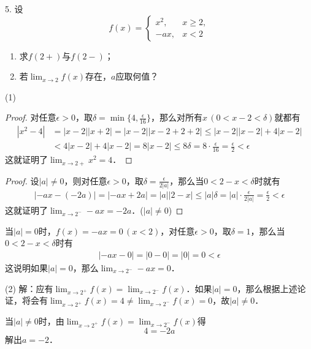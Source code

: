 5. 设
\begin{equation}
    f(x) = \begin{cases}
        x^2, & x \geq 2, \\
        -ax, & x < 2
    \end{cases}
\end{equation}
\begin{enumerate}
    \item 求$f(2+)$与$f(2-)$；
    \item 若$\displaystyle\lim_{x \to 2} f(x)$存在，$a$应取何值？
\end{enumerate}

(1)
\begin{proof}
    对任意$\epsilon > 0$，取$\delta = \min \{ 4, \displaystyle\frac{\epsilon}{16} \}$，那么对所有$x \, (0 < x - 2 < \delta)$就都有
    \begin{align}
        |x^2 - 4| &= |x-2||x+2| = |x-2||x-2 + 2 +2| \leq |x-2||x-2| + 4|x-2| \\
        &< 4|x-2| + 4|x-2| = 8|x-2| \leq 8 \delta = 8 \cdot \frac{\epsilon}{16} = \frac{\epsilon}{2} < \epsilon
    \end{align}
这就证明了$\displaystyle\lim_{x \to 2+} x^2 = 4$．
\end{proof}

\begin{proof}
设$|a| \neq 0$，则对任意$\epsilon > 0$，取$\delta = \displaystyle\frac{\epsilon}{2|a|}$，那么当$0 < 2 - x < \delta$时就有
\begin{align}
|-ax - (-2a)| = |-ax + 2a| = |a||2-x| \leq |a|\delta = |a| \cdot \frac{\epsilon}{2 |a|} = \frac{\epsilon}{2} < \epsilon
\end{align}
这就证明了$\displaystyle\lim_{x \to 2^-} -ax = -2a$．($|a| \neq 0$)
\end{proof}

当$|a|=0$时，$f(x) = -ax = 0 \, (x < 2)$，对任意$\epsilon > 0$，取$\delta = 1$，那么当$0 < 2 - x < \delta$时有
\begin{align}
    |-ax - 0| = |0 - 0| = |0| = 0 < \epsilon
\end{align}
这说明如果$|a|=0$，那么$\displaystyle\lim_{x \to 2^-} -ax = 0$．

(2) 解：应有$\displaystyle \lim_{x \to 2^+} f(x) = \displaystyle\lim_{x \to 2^-} f(x)$．如果$|a| = 0$，那么根据上述论证，将会有$\displaystyle\lim_{x \to 2^+} f(x) = 4 \neq \displaystyle\lim_{x \to 2^-} f(x) = 0$，故$|a|\neq 0$．

当$|a| \neq 0$时，由$\displaystyle\lim_{x \to 2^+} f(x) = \displaystyle\lim_{x \to 2^-} f(x)$得
\begin{equation}
    4 = -2a
\end{equation}
解出$a = -2$．


